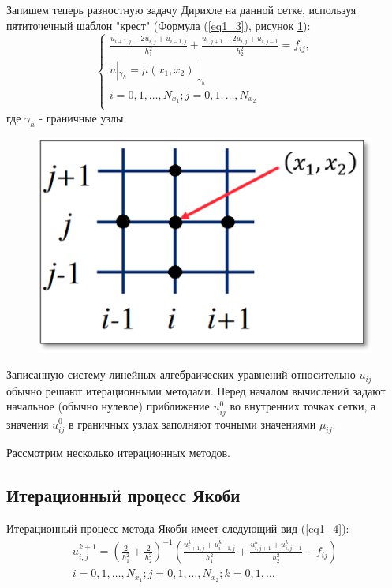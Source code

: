 \documentclass[a4paper, 14pt]{extreport}
\begin{document}
	Запишем теперь разностную задачу Дирихле на данной сетке, используя пятиточечный шаблон "крест" (Формула (\ref{eq1_3}), рисунок \ref{i1_1}):
	\begin{equation}\label{eq1_3} 
		\begin{cases}
			\frac{u_{i+1,j}-2u_{i,j}+u_{i-1,j}}{h_1^2} + \frac{u_{i,j+1}-2u_{i,j}+u_{i,j-1}}{h_2^2} = f_{ij}, \\
			u|_{\gamma_h} = \mu(x_1, x_2)|_{\gamma_h} \\
			i=0,1,\dots,N_{x_1} ; j=0,1,\dots,N_{x_2} \\
		\end{cases}
	\end{equation}
	где $\gamma_h$ - граничные узлы.
	\begin{figure}[h]
		\begin{center}
			\includegraphics[width=0.5\linewidth]{5_dots}
			\label{i1_1}
		\end{center}
	\end{figure}

	Записанную систему линейных алгебраических уравнений относительно $u_{ij}$ обычно решают итерационными методами. Перед началом вычислений задают начальное (обычно нулевое) приближение $u^0_{ij}$ во внутренних точках сетки, а значения $u^0_{ij}$ в граничных узлах заполняют точными значениями $\mu_{ij}$.
	
	Рассмотрим несколько итерационных методов.
	
	\subsection{Итерационный процесс Якоби}
	Итерационный процесс метода Якоби имеет следующий вид (\ref{eq1_4}):
	\begin{equation}\label{eq1_4}
		\begin{split}
			u^{k+1}_{i,j} = 
				\left(\frac{2}{h_1^2}+\frac{2}{h_2^2}\right)^{-1} 
				\left(\frac{u_{i+1,j}^k+u_{i-1,j}^k}{h_1^2} + \frac{u_{i,j+1}^k+u_{i,j-1}^k}{h_2^2} - f_{ij}\right)\\
			i=0,1,\dots,N_{x_1}; j=0,1,\dots,N_{x_2}; k=0,1,\dots
		\end{split}
	\end{equation}
	
\end{document}
